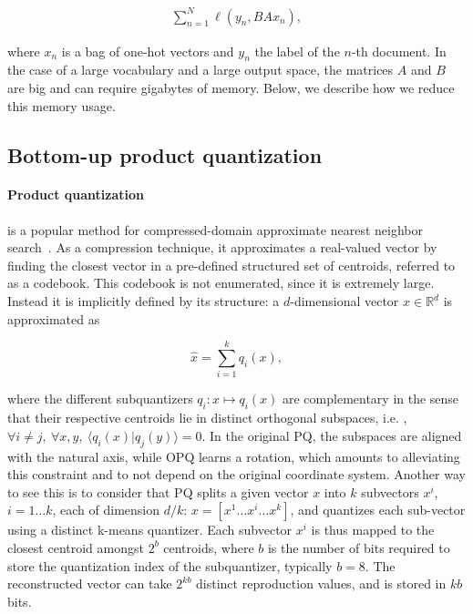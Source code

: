 \begin{eqnarray}\label{eq:fasttext}
\sum_{n=1}^N \ell(y_n, BAx_n),
\end{eqnarray}

where $x_n$ is a bag of one-hot vectors and $y_n$ the label of the $n$-th document. In the case of a large vocabulary and a large output space, the matrices $A$ and $B$ are big and can require  gigabytes of memory. Below, we describe how we reduce this memory usage. 

\subsection{Bottom-up product quantization}
\label{sec:retrain}

\paragraph{Product quantization} is a popular method for compressed-domain approximate nearest neighbor search~\citep{JDS11}. As a compression technique, it approximates a real-valued vector by finding the closest vector in a pre-defined structured set of centroids, referred to as a codebook. This codebook is not enumerated, since it is extremely large. Instead it is implicitly defined by its structure: a $d$-dimensional vector $x \in {\mathbb R}^d$ is approximated as

\begin{equation}
\hat{x} = \sum_{i=1}^k q_i(x), 
\end{equation}

where the different subquantizers $q_i:x \mapsto q_i(x)$ are complementary in the sense that their respective centroids lie in distinct orthogonal subspaces, i.e. , $\forall i \ne j,\ \forall x,y,\ \langle q_i(x) | q_j(y) \rangle = 0$. In the original PQ, the subspaces are aligned with the natural axis, while OPQ learns a rotation, which amounts to alleviating this constraint and to not depend on the original coordinate system. Another way to see this is to consider that PQ splits a given vector $x$ into $k$ subvectors $x^i$,
$i=1\dots k$, each of dimension $d/k$:  $x=[x^1 \dots x^i \dots x^k]$, and quantizes each sub-vector using a distinct k-means quantizer. Each subvector $x^i$ is thus mapped to the closest centroid amongst $2^b$ centroids, where $b$ is the number of bits required to store the quantization index of the subquantizer, typically $b=8$. The reconstructed vector  can take $2^{kb}$ distinct reproduction values, and is stored in $kb$ bits.  

